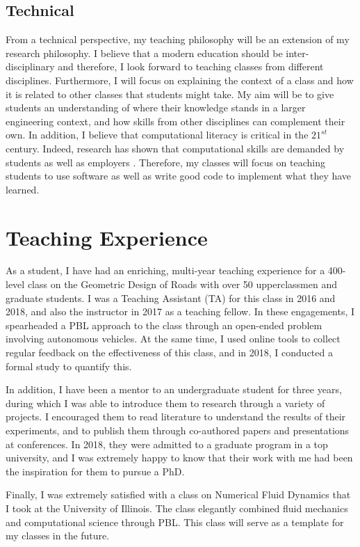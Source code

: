 \documentclass[12pt]{article}
\begin{document}
\subsection*{Technical}  
From a technical perspective, my teaching philosophy will be an extension of my research philosophy. I believe that a modern education should be inter-disciplinary and therefore, I look forward to teaching classes from different disciplines. Furthermore, I will focus on explaining the context of a class and how it is related to other classes that students might take. My aim will be to give students an understanding of where their knowledge stands in a larger engineering context, and how skills from other disciplines can complement their own. In addition, I believe that computational literacy is critical in the $21^{st}$ century. Indeed, research has shown that computational skills are demanded by students as well as employers \cite{magana2012motivation}. Therefore, my classes will focus on teaching students to use software as well as write good code to implement what they have learned.

\section*{Teaching Experience}
As a student, I have had an enriching, multi-year teaching experience for a 400-level class on the Geometric Design of Roads with over 50 upperclassmen and graduate students. I was a Teaching Assistant (TA) for this class in 2016 and 2018, and also the instructor in 2017 as a teaching fellow. In these engagements, I spearheaded a PBL approach to the class through an open-ended problem involving autonomous vehicles. At the same time, I used online tools to collect regular feedback on the effectiveness of this class, and in 2018, I conducted a formal study to quantify this.

In addition, I have been a mentor to an undergraduate student for three years, during which I was able to introduce them to research through a variety of projects. I encouraged them to read literature to understand the results of their experiments, and to publish them through co-authored papers and presentations at conferences. In 2018, they were admitted to a graduate program in a top university, and I was extremely happy to know that their work with me had been the inspiration for them to pursue a PhD.

Finally, I was extremely satisfied with a class on Numerical Fluid Dynamics that I took at the University of Illinois. The class elegantly combined fluid mechanics and computational science through PBL. This class will serve as a template for my classes in the future.
\end{document}
